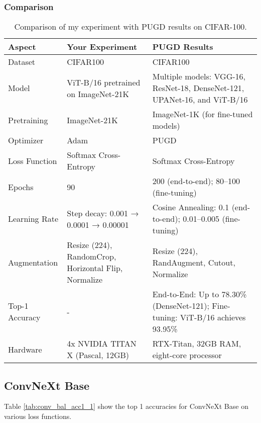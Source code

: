 \subsubsection{Comparison}

\begin{table}[H]
    \centering
    \renewcommand{\arraystretch}{1.2} %
    \setlength{\tabcolsep}{4pt} %
    \begin{tabular}{lp{6cm}p{6cm}}
        \toprule
        \textbf{Aspect} & \textbf{Your Experiment} & \textbf{PUGD Results} \\ 
        \midrule
        Dataset           & CIFAR100 & CIFAR100 \\
        Model             & ViT-B/16 pretrained on ImageNet-21K & Multiple models: VGG-16, ResNet-18, DenseNet-121, UPANet-16, and ViT-B/16 \\
        Pretraining       & ImageNet-21K & ImageNet-1K (for fine-tuned models) \\
        Optimizer         & Adam & PUGD \\
        Loss Function     & Softmax Cross-Entropy & Softmax Cross-Entropy \\
        Epochs            & 90 & 200 (end-to-end); 80–100 (fine-tuning) \\
        Learning Rate     & Step decay: 0.001 → 0.0001 → 0.00001 & Cosine Annealing: 0.1 (end-to-end); 0.01–0.005 (fine-tuning) \\
        Augmentation      & Resize (224), RandomCrop, Horizontal Flip, Normalize & Resize (224), RandAugment, Cutout, Normalize \\
        Top-1 Accuracy    & - & End-to-End: Up to 78.30\% (DenseNet-121); Fine-tuning: ViT-B/16 achieves 93.95\% \\
        Hardware          & 4x NVIDIA TITAN X (Pascal, 12GB) & RTX-Titan, 32GB RAM, eight-core processor \\
        \bottomrule
    \end{tabular}
    \caption{Comparison of my experiment with PUGD results on CIFAR-100.}
    \label{tab:comparison3}
\end{table}


\subsection{ConvNeXt Base}

Table \ref{tab:conv_bal_acc1_1} show the top 1 accuracies for ConvNeXt Base on various loss functions.

